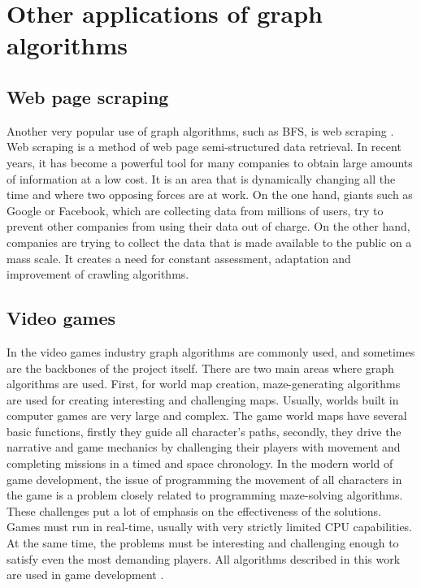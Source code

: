 \section{Other applications of graph algorithms}
\subsection{Web page scraping}
Another very popular use of graph algorithms, such as BFS, is web scraping \cite{24}. Web scraping is a method of web page semi-structured data retrieval. In recent years, it has become a powerful tool
for many companies to obtain large amounts of information at a low cost. It is an area that is dynamically changing all the time and where two opposing forces are at work. On the one hand,
giants such as Google or Facebook, which are collecting data from millions of users, try to prevent other companies from using their data out of charge. On the other hand, companies 
are trying to collect the data that is made available to the public on a mass scale. It creates a need for constant assessment, adaptation and improvement of crawling algorithms.
\subsection{Video games}
In the video games industry graph algorithms are commonly used, and sometimes are the backbones of the project itself. There are two main areas where graph algorithms are used. 
First, for world map creation, maze-generating algorithms are used for creating interesting and challenging maps. Usually, worlds built in computer games are very large and complex.
The game world maps have several basic functions, firstly they guide all character's paths, secondly, they drive the narrative and game mechanics by challenging their players with movement
and completing missions in a timed and space chronology. In the modern world of game development, the issue of programming the movement of all characters in 
the game is a problem closely related to programming maze-solving algorithms. These challenges put a lot of emphasis on the effectiveness of the solutions. 
Games must run in real-time, usually with very strictly limited CPU capabilities. At the same time, the problems must be interesting and challenging enough 
to satisfy even the most demanding players. All algorithms described in this work are used in game development \cite{25}.
